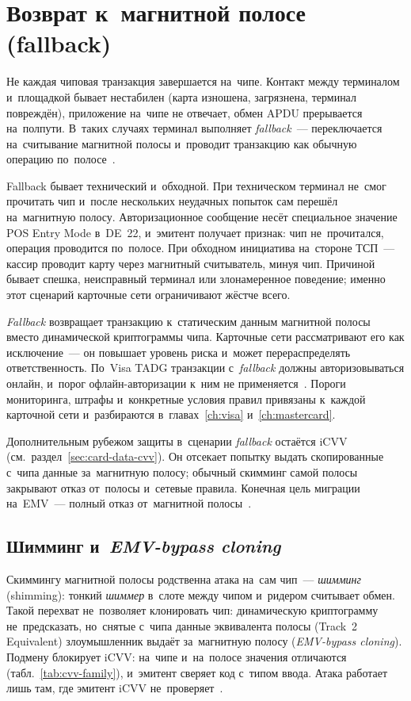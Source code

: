 \section{Возврат к~магнитной полосе (fallback)}\label{sec:emv-fallback}

Не каждая чиповая транзакция завершается на~чипе. Контакт между терминалом
и~площадкой бывает нестабилен (карта изношена, загрязнена, терминал повреждён),
приложение на~чипе не отвечает, обмен APDU прерывается на~полпути. В~таких
случаях терминал выполняет \textit{fallback}~--- переключается на~считывание
магнитной полосы и~проводит транзакцию как обычную операцию
по~полосе~\cite{emvco-book4}.

Fallback бывает технический и~обходной. При техническом терминал не~смог
прочитать чип и~после нескольких неудачных попыток сам перешёл на~магнитную
полосу. Авторизационное сообщение несёт специальное значение POS Entry Mode
в~DE~22, и~эмитент получает признак: чип не~прочитался, операция проводится
по~полосе. При обходном инициатива на~стороне ТСП~--- кассир проводит карту
через магнитный считыватель, минуя чип. Причиной бывает спешка, неисправный
терминал или злонамеренное поведение; именно этот сценарий карточные сети
ограничивают жёстче всего.

\textit{Fallback} возвращает транзакцию к~статическим данным магнитной полосы
вместо динамической криптограммы чипа. Карточные сети рассматривают его как
исключение~--- он повышает уровень риска и~может перераспределять
ответственность. По~Visa TADG транзакции с~\textit{fallback} должны авторизовываться онлайн, и~порог офлайн-авторизации
к~ним не применяется~\cite{visa-tadg}. Пороги мониторинга, штрафы и~конкретные
условия правил привязаны к~каждой карточной сети и~разбираются
в~главах~\ref{ch:visa} и~\ref{ch:mastercard}.

Дополнительным рубежом защиты в~сценарии \textit{fallback} остаётся iCVV
(см.~раздел~\ref{sec:card-data-cvv}). Он отсекает попытку выдать скопированные
с~чипа данные за~магнитную полосу; обычный скимминг самой полосы закрывают
отказ от~полосы и~сетевые правила. Конечная цель миграции на~EMV~--- полный отказ от~магнитной
полосы~\cite{visa-core-rules}.

\subsection*{Шимминг и~\textit{EMV-bypass cloning}}

Скиммингу магнитной полосы родственна атака на~сам чип~--- \textit{шимминг}
(shimming): тонкий \textit{шиммер} в~слоте между чипом и~ридером считывает
обмен. Такой перехват не~позволяет клонировать чип: динамическую криптограмму
не~предсказать, но~снятые с~чипа данные эквивалента полосы (Track~2 Equivalent)
злоумышленник выдаёт за~магнитную полосу (\textit{EMV-bypass cloning}).
Подмену блокирует iCVV: на~чипе и~на~полосе значения отличаются
(табл.~\ref{tab:cvv-family}), и~эмитент сверяет код с~типом ввода. Атака
работает лишь там, где эмитент iCVV не~проверяет~\cite{gemini-emv-bypass-cloning}.


